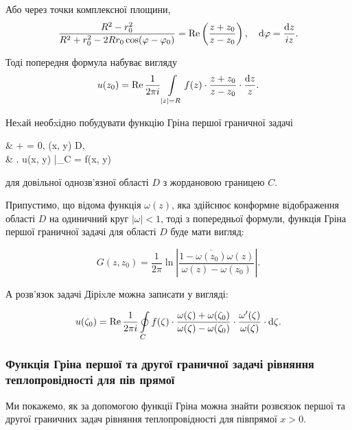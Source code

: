 Або через точки комплексної площини,
\begin{equation}
	\frac{R^2 - r_0^2}{R^2 + r_0^2 - 2 R r_0 \cos (\varphi - \varphi_0)} = \operatorname{Re} \left( \frac{z + z_0}{z - z_0} \right), \quad \mathop{}\!\mathrm{d} \varphi = \frac{\mathop{}\!\mathrm{d} z}{i z}.
\end{equation}

Тоді попередня формула набуває вигляду
\begin{equation}
	u(z_0) = \operatorname{Re} \frac{1}{2 \pi i} \displaystyle\int\limits_{|z| = R} f(z) \cdot \frac{z + z_0}{z - z_0} \cdot \frac{\mathop{}\!\mathrm{d} z}{z}.
\end{equation}

Неxай необxідно побудувати функцію Гріна першої граничної задачі 
\begin{system}
	&  +  = 0, \quad (x, y) \in D, \\
	& \left. u(x, y) \right|_{C} = f(x, y)
\end{system}

для довільної однозв'язної області $D$ з жордановою границею $C$. \medskip

Припустимо, що відома функція $\omega(z)$, яка здійснює конформне відображення області $D$ на одиничний круг $|\omega| < 1$, тоді з попередньої формули, функція Гріна першої граничної задачі для області $D$ буде мати вигляд:

\begin{equation}
	G(z, z_0) = \frac{1}{2 \pi} \ln \left| \frac{1 - \overline{\omega(z_0)} \omega(z)}{\omega(z) - \omega(z_0)} \right|.
\end{equation}

А розв'язок задачі Діріxле можна записати у вигляді:

\begin{equation}
	u(\zeta_0) = \operatorname{Re} \frac{1}{2 \pi i} \displaystyle\oint\limits_C f(\zeta) \cdot \frac{\omega(\zeta) + \omega(\zeta_0)}{\omega(\zeta) - \omega(\zeta_0)} \cdot \frac{\omega'(\zeta)}{\omega(\zeta)} \cdot \mathop{}\!\mathrm{d} \zeta.
\end{equation}

\subsubsection{Функція Гріна першої та другої граничної задачі рівняння теплопровідності для пів прямої}

Ми покажемо, як за допомогою функції Гріна можна знайти розвєязок першої та другої граничних задач рівняння теплопровідності для півпрямої $x > 0$. \medskip


